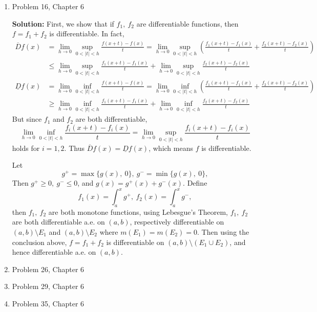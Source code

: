 \documentclass{article}%
\begin{document}
\begin{enumerate}
\item  Problem 16, Chapter 6

\smallskip
\textbf{Solution:}
\smallskip
First, we show that if $f_1, ~f_2$ are differentiable functions, then $f = f_1+f_2$ is differentiable. In fact,
$$
\begin{aligned}
\overline{D}f(x) &= \lim_{h\to 0}\sup_{0 < |t| < h}\frac{f(x+t)-f(x)}{t} = \lim_{h\to 0}\sup_{0 < |t| < h}(\frac{f_1(x+t)-f_1(x)}{t}+\frac{f_2(x+t)-f_2(x)}{t}) \\
&\le \lim_{h\to 0}\sup_{0 < |t| < h}\frac{f_1(x+t)-f_1(x)}{t} + \lim_{h\to 0}\sup_{0 < |t| < h}\frac{f_2(x+t)-f_2(x)}{t}
\end{aligned}
$$
$$
\begin{aligned}
\underline{D}f(x) &= \lim_{h\to 0}\inf_{0 < |t| < h}\frac{f(x+t)-f(x)}{t} = \lim_{h\to 0}\inf_{0 < |t| < h}(\frac{f_1(x+t)-f_1(x)}{t}+\frac{f_2(x+t)-f_2(x)}{t}) \\
&\ge \lim_{h\to 0}\inf_{0 < |t| < h}\frac{f_1(x+t)-f_1(x)}{t} + \lim_{h\to 0}\inf_{0 < |t| < h}\frac{f_2(x+t)-f_2(x)}{t}
\end{aligned}
$$
But since $f_1$ and $f_2$ are both differentiable, 
$$
\lim_{h\to 0}\inf_{0 < |t| < h}\frac{f_i(x+t)-f_i(x)}{t} = \lim_{h\to 0}\sup_{0 < |t| < h}\frac{f_i(x+t)-f_i(x)}{t}
$$
holds for $i = 1, 2$. Thus $\overline{D}f(x) = \underline{D}f(x)$, which means $f$ is differentiable.

Let
$$
g^+ = \max\{g(x), ~0\}, ~g^- = \min\{g(x), ~0\},
$$
Then $g^+ \ge 0, ~g^- \le 0$, and $g(x) = g^+(x) + g^-(x)$. Define
$$
f_1(x) = \int_{a}^{x}g^+, ~f_2(x) = \int_{a}^{x}g^-,
$$
then $f_1, ~f_2$ are both monotone functions, using Lebesgue's Theorem, $f_1, ~f_2 $ are both differentiable a.e. on $(a, b)$, respectively differentiable on $(a, b)\setminus E_1 $ and $(a, b) \setminus E_2 $ where $m(E_1) = m(E_2) = 0$. Then using the conclusion above, $f = f_1 + f_2 $ is differentiable on $(a, b)\setminus (E_1\cup E_2)$, and hence differentiable a.e. on $(a, b)$.





\item  Problem 26, Chapter 6
\item  Problem 29, Chapter 6
\item  Problem 35, Chapter 6

\end{enumerate}
\end{document}
